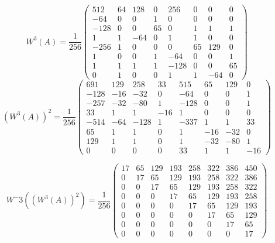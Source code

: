 \begin{equation}
\label{equ:w3aexamp}
W^3(A)= \frac{1}{256} \left(
\begin{array}{cccccccc}
512 & 64 & 128 & 0 & 256 & 0 & 0 & 0\\
-64 & 0 & 0 & 1 & 0 & 0 & 0 & 0\\
-128 & 0 & 0 & 65 & 0 & 1 & 1 & 1\\
1 & 1 & -64 & 0 & 1 & 1 & 0 & 0\\
-256 & 1 & 0 & 0 & 0 & 65 & 129 & 0\\
1 & 0 & 0 & 1 & -64 & 0 & 0 & 1\\
1 & 1 & 1 & 1 & -128 & 0 & 0 & 65\\
0 & 1 & 0 & 0 & 1 & 1 & -64 & 0 
\end{array} \right)
\end{equation}
\begin{equation}
\label{equ: w3aexamp2}
(W^3(A))^2= \frac{1}{256} \left(
\begin{array}{cccccccc}
691 & 129 & 258 & 33 & 515 & 65 & 129 & 0\\
-128 & -16 & -32 & 0 & -64 & 0 & 0 & 1\\
-257 & -32 & -80 & 1 & -128 & 0 & 0 & 1\\
33 & 1 & 1 & -16 & 1 & 0 & 0 & 0\\
-514 & -64 & -128 & 1 & -337 & 1 & 1 & 33\\
65 & 1 & 1 & 0 & 1 & -16 & -32 & 0\\
129 & 1 & 1 & 0 & 1 & -32 & -80 & 1\\
0 & 0 & 0 & 0 & 33 & 1 & 1 & -16 
\end{array} \right)
\end{equation}

\begin{equation}
\label{equ: invw3aexamp2}
W^-3((W^3(A))^2)= \frac{1}{256} \left(
\begin{array}{cccccccc}
17 & 65 & 129 & 193 & 258 & 322 & 386 & 450\\
0 & 17 & 65 & 129 & 193 & 258 & 322 & 386\\
0 & 0 & 17 & 65 & 129 & 193 & 258 & 322\\
0 & 0 & 0 & 17 & 65 & 129 & 193 & 258\\
0 & 0 & 0 & 0 & 17 & 65 & 129 & 193\\
0 & 0 & 0 & 0 & 0 & 17 & 65 & 129\\
0 & 0 & 0 & 0 & 0 & 0 & 17 & 65\\
0 & 0 & 0 & 0 & 0 & 0 & 0 & 17
\end{array} \right)
\end{equation}

